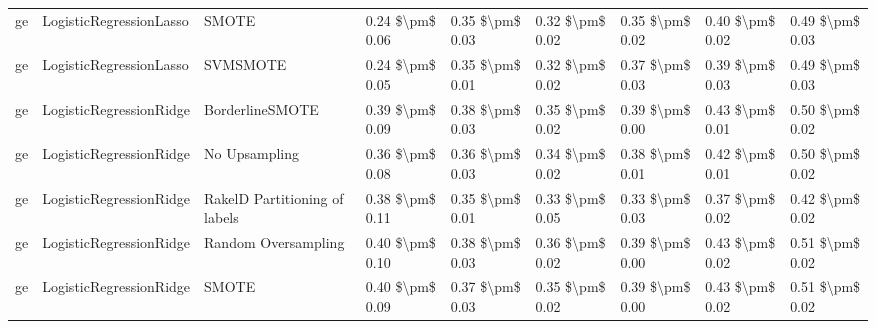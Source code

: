 \begin{tabular}{lllllllll}
      ge &         LogisticRegressionLasso &                         SMOTE &     0.24 \$\textbackslash pm\$ 0.06 &           0.35 \$\textbackslash pm\$ 0.03 &       0.32 \$\textbackslash pm\$ 0.02 &        0.35 \$\textbackslash pm\$ 0.02 &                         0.40 \$\textbackslash pm\$ 0.02 &     0.49 \$\textbackslash pm\$ 0.03 \\
      ge &         LogisticRegressionLasso &                      SVMSMOTE &     0.24 \$\textbackslash pm\$ 0.05 &           0.35 \$\textbackslash pm\$ 0.01 &       0.32 \$\textbackslash pm\$ 0.02 &        0.37 \$\textbackslash pm\$ 0.03 &                         0.39 \$\textbackslash pm\$ 0.03 &     0.49 \$\textbackslash pm\$ 0.03 \\
      ge &         LogisticRegressionRidge &               BorderlineSMOTE &     0.39 \$\textbackslash pm\$ 0.09 &           0.38 \$\textbackslash pm\$ 0.03 &       0.35 \$\textbackslash pm\$ 0.02 &        0.39 \$\textbackslash pm\$ 0.00 &                         0.43 \$\textbackslash pm\$ 0.01 &     0.50 \$\textbackslash pm\$ 0.02 \\
      ge &         LogisticRegressionRidge &                 No Upsampling &     0.36 \$\textbackslash pm\$ 0.08 &           0.36 \$\textbackslash pm\$ 0.03 &       0.34 \$\textbackslash pm\$ 0.02 &        0.38 \$\textbackslash pm\$ 0.01 &                         0.42 \$\textbackslash pm\$ 0.01 &     0.50 \$\textbackslash pm\$ 0.02 \\
      ge &         LogisticRegressionRidge & RakelD Partitioning of labels &     0.38 \$\textbackslash pm\$ 0.11 &           0.35 \$\textbackslash pm\$ 0.01 &       0.33 \$\textbackslash pm\$ 0.05 &        0.33 \$\textbackslash pm\$ 0.03 &                         0.37 \$\textbackslash pm\$ 0.02 &     0.42 \$\textbackslash pm\$ 0.02 \\
      ge &         LogisticRegressionRidge &           Random Oversampling &     0.40 \$\textbackslash pm\$ 0.10 &           0.38 \$\textbackslash pm\$ 0.03 &       0.36 \$\textbackslash pm\$ 0.02 &        0.39 \$\textbackslash pm\$ 0.00 &                         0.43 \$\textbackslash pm\$ 0.02 &     0.51 \$\textbackslash pm\$ 0.02 \\
      ge &         LogisticRegressionRidge &                         SMOTE &     0.40 \$\textbackslash pm\$ 0.09 &           0.37 \$\textbackslash pm\$ 0.03 &       0.35 \$\textbackslash pm\$ 0.02 &        0.39 \$\textbackslash pm\$ 0.00 &                         0.43 \$\textbackslash pm\$ 0.02 &     0.51 \$\textbackslash pm\$ 0.02 \\

\end{tabular}
